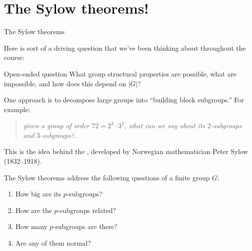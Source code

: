 \documentclass[8pt]{beamer}
\newcommand{\Pause}{\pause}      %
\begin{document}
\section{The Sylow theorems!}


\begin{frame}{The Sylow theorems} %

  Here is sort of a driving question that we've been thinking about throughout the course: \smallskip
  
  \begin{exampleblock}{Open-ended question}
    What group structural properties are possible, what are
    impossible, and how does this depend on $|G|$?
  \end{exampleblock}

  \smallskip\Pause
  
  One approach is to decompose large groups into ``building block
  subgroups.'' \Pause For example:
  
  \smallskip
  
  \begin{quote}
    \emph{given a group of order $72=2^3\cdot 3^2$, what can we say
      about its $2$-subgroups and $3$-subgroups?}.
  \end{quote}
    
  \smallskip\Pause

  This is the idea behind the , developed by
  Norwegian mathematician Peter Sylow (1832--1918). \medskip\Pause

  The Sylow theorems address the following questions of a finite group $G$:
  
  \smallskip\Pause
  
  \begin{enumerate}
    \item How big are its $p$-subgroups? \smallskip\Pause
    \item How are the $p$-subgroups related? \smallskip\Pause
    \item How many $p$-subgroups are there? \smallskip\Pause
    \item Are any of them normal? 
  \end{enumerate}
  
\end{frame}

\end{document}
